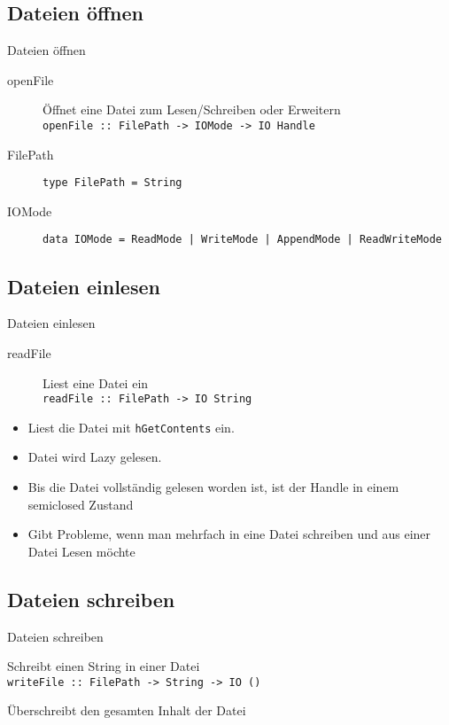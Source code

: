 \documentclass{beamer}
\begin{document}
\subsection{Dateien \"offnen}
\begin{frame}[<+->]{Dateien \"offnen}
\begin{description}
\item[openFile] Öffnet eine Datei zum Lesen/Schreiben oder Erweitern \\ \texttt{\small openFile :: FilePath -> IOMode -> IO Handle}
\item[FilePath] \texttt{type FilePath = String}
\item[IOMode] \texttt{data IOMode = ReadMode | WriteMode | AppendMode | ReadWriteMode}
\end{description}
\end{frame}

\subsection{Dateien einlesen}
\begin{frame}[<+->]{Dateien einlesen}
\begin{description}
\item[readFile] Liest eine Datei ein \\ \texttt{readFile :: FilePath -> IO String}
\end{description}
\begin{itemize}
\item Liest die Datei mit \texttt{hGetContents} ein.
\item Datei wird Lazy gelesen.
\item Bis die Datei vollständig gelesen worden ist, ist der Handle in einem semiclosed Zustand
\item Gibt Probleme, wenn man mehrfach in eine Datei schreiben und aus einer Datei Lesen möchte
\end{itemize}
\end{frame}

\subsection{Dateien schreiben}
\begin{frame}[<+->]{Dateien schreiben}
\begin{description}
\item[writeFile] Schreibt einen String in einer Datei \\ \texttt{writeFile :: FilePath -> String -> IO ()}
\item Überschreibt den gesamten Inhalt der Datei
\end{description}
\end{frame}
\end{document}
